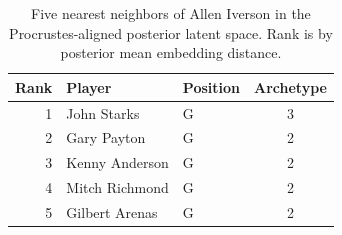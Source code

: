 \begin{table}[htbp]
  \centering\small
  \begin{tabular}{rllc}
    \toprule
    Rank & Player & Position & Archetype \\
    \midrule
    1 & John Starks & G & 3 \\
    2 & Gary Payton & G & 2 \\
    3 & Kenny Anderson & G & 2 \\
    4 & Mitch Richmond & G & 2 \\
    5 & Gilbert Arenas & G & 2 \\
    \bottomrule
  \end{tabular}
  \caption{Five nearest neighbors of Allen Iverson in the Procrustes-aligned posterior latent space. Rank is by posterior mean embedding distance.}
  \label{tab:Allen_Iverson_neighbors}
\end{table}

